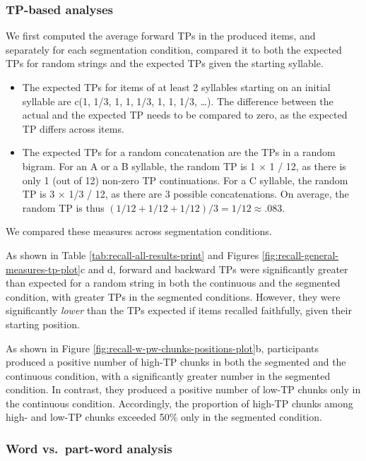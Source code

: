 \documentclass[]{article}
\providecommand{\tightlist}{%
  \setlength{\itemsep}{0pt}\setlength{\parskip}{0pt}}
\begin{document}
\subsubsection{TP-based analyses}\label{tp-based-analyses}

We first computed the average forward TPs in the produced items, and
separately for each segmentation condition, compared it to both the
expected TPs for random strings and the expected TPs given the starting
syllable.

\begin{itemize}
\tightlist
\item
  The expected TPs for items of at least 2 syllables starting on an
  initial syllable are c(1, 1/3, 1, 1, 1/3, 1, 1, 1/3, \ldots{}). The
  difference between the actual and the expected TP needs to be compared
  to zero, as the expected TP differs across items.
\item
  The expected TPs for a random concatenation are the TPs in a random
  bigram. For an A or a B syllable, the random TP is 1 \(\times\) 1 /
  12, as there is only 1 (out of 12) non-zero TP continuations. For a C
  syllable, the random TP is 3 \(\times\) 1/3 / 12, as there are 3
  possible concatenations. On average, the random TP is thus
  \((1/12 + 1/12 + 1/12)/ 3 = 1/12 \approx .083\).
\end{itemize}

We compared these measures across segmentation conditions.

As shown in Table \ref{tab:recall-all-results-print} and Figures
\ref{fig:recall-general-measures-tp-plot}c and d, forward and backward
TPs were significantly greater than expected for a random string in both
the continuous and the segmented condition, with greater TPs in the
segmented conditions. However, they were significantly \emph{lower} than
the TPs expected if items recalled faithfully, given their starting
position.

As shown in Figure \ref{fig:recall-w-pw-chunks-positions-plot}b,
participants produced a positive number of high-TP chunks in both the
segmented and the continuous condition, with a significantly greater
number in the segmented condition. In contrast, they produced a positive
number of low-TP chunks only in the continuous condition. Accordingly,
the proportion of high-TP chunks among high- and low-TP chunks exceeded
50\% only in the segmented condition.

\subsubsection{Word vs.~part-word
analysis}\label{word-vs.part-word-analysis}
\end{document}
